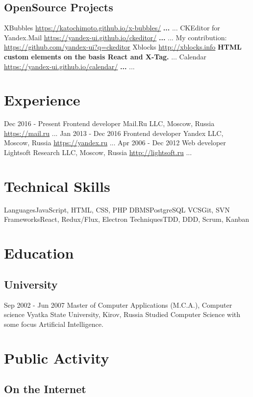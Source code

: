 \documentclass[11pt,a4paper]{moderncv}
\begin{document}
  \subsection{OpenSource Projects}
  \cvline
    {XBubbles}
    {\url{https://katochimoto.github.io/x-bubbles/}\newline{}
    \textbf{...}\newline{}
    ...}
  \cvline
    {CKEditor for Yandex.Mail}
    {\url{https://yandex-ui.github.io/ckeditor/}\newline{}
    \textbf{...}\newline{}
    ...\newline{}
    My contribution:\newline{}
    \url{https://github.com/yandex-ui?q=ckeditor}
    }
  \cvline
    {Xblocks}
    {\url{http://xblocks.info}\newline{}
    \textbf{HTML custom elements on the basis React and X-Tag.}\newline{}
    ...}
  \cvline
    {Calendar}
    {\url{https://yandex-ui.github.io/calendar/}\newline{}
    \textbf{...}\newline{}
    ...}
\pagebreak
\section{Experience}
\cventry
  {Dec 2016 - Present}
  {Frontend developer}
  {Mail.Ru LLC, Moscow, Russia}
  {\newline{}\url{https://mail.ru}}{}
  {...}
\cventry
  {Jan 2013 - Dec 2016}
  {Frontend developer}
  {Yandex LLC, Moscow, Russia}
  {\newline{}\url{https://yandex.ru}}{}
  {...}
\cventry
  {Apr 2006 - Dec 2012}
  {Web developer}
  {Lightsoft Research LLC, Moscow, Russia}
  {\newline{}\url{http://lightsoft.ru}}{}
  {...}

\section{Technical Skills}
\cvline
  {Languages}{JavaScript, HTML, CSS, PHP}
\cvline
  {DBMS}{PostgreSQL}
\cvline
  {VCS}{Git, SVN}
\cvline
  {Frameworks}{React, Redux/Flux, Electron}
\cvline
  {Techniques}{TDD, DDD, Scrum, Kanban}
\section{Education}
  \subsection{University}
  \cventry
    {Sep 2002 - Jun 2007}
    {Master of Computer Applications (M.C.A.), Computer science}
    {\newline Vyatka State University, Kirov, Russia}
    {}{}
    {Studied Computer Science with some focus Artificial Intelligence.}

\section{Public Activity}
  \subsection{On the Internet}
\end{document}
